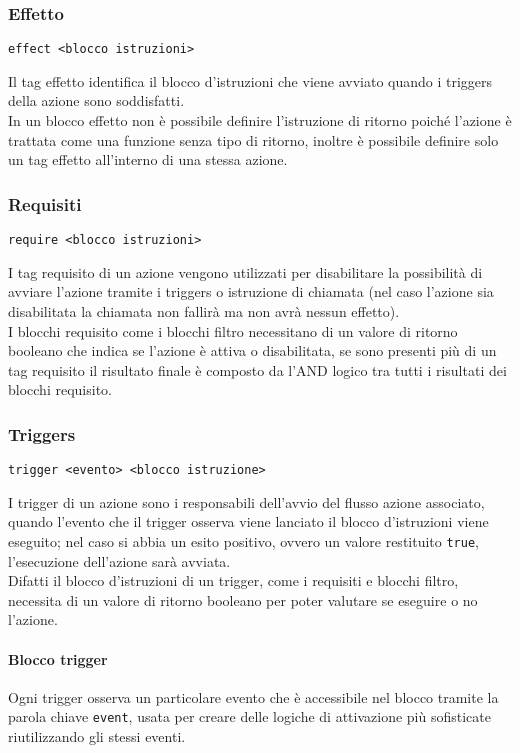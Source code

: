 \subsubsection{Effetto}
\begin{lstlisting}
effect <blocco istruzioni>
\end{lstlisting} 
Il tag effetto identifica il blocco d'istruzioni che viene avviato quando i triggers della azione sono 
soddisfatti. \\
In un blocco effetto non è possibile definire l'istruzione di ritorno poiché l'azione è trattata come 
una funzione senza tipo di ritorno, inoltre è possibile definire solo un tag effetto all'interno 
di una stessa azione.

\subsubsection{Requisiti}
\begin{lstlisting}
require <blocco istruzioni> 
\end{lstlisting}
I tag requisito di un azione vengono utilizzati per disabilitare la possibilità di avviare 
l'azione tramite i triggers o istruzione di chiamata (nel caso l'azione sia 
disabilitata la chiamata non fallirà ma non avrà nessun effetto). \\
I blocchi requisito come i blocchi filtro necessitano di un valore di ritorno booleano che indica 
se l'azione è attiva o disabilitata, se sono presenti più di un tag requisito il risultato finale
è composto da l'AND logico tra tutti i risultati dei blocchi requisito.

\subsubsection{Triggers}
\begin{lstlisting}
trigger <evento> <blocco istruzione>
\end{lstlisting}
I trigger di un azione sono i responsabili dell'avvio del flusso azione associato, 
quando l'evento che il trigger osserva viene lanciato il blocco d'istruzioni viene eseguito; 
nel caso si abbia un esito positivo, ovvero un valore restituito \verb|true|, 
l'esecuzione dell'azione sarà avviata. \\
Difatti il blocco d'istruzioni di un trigger, come i requisiti e blocchi filtro, necessita di un 
valore di ritorno booleano per poter valutare se eseguire o no l'azione.

\paragraph{Blocco trigger}
Ogni trigger osserva un particolare evento che è accessibile nel blocco tramite la parola chiave 
\verb|event|, usata per creare delle logiche di attivazione più sofisticate riutilizzando gli stessi eventi. \\

